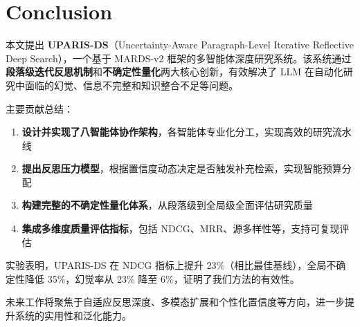 \documentclass[12pt,a4paper]{article}
\begin{document}
\section{Conclusion}
本文提出 \textbf{UPARIS-DS}（Uncertainty-Aware Paragraph-Level Iterative Reflective Deep Search），一个基于 MARDS-v2 框架的多智能体深度研究系统。该系统通过\textbf{段落级迭代反思机制}和\textbf{不确定性量化}两大核心创新，有效解决了 LLM 在自动化研究中面临的幻觉、信息不完整和知识整合不足等问题。

主要贡献总结：
\begin{enumerate}
    \item \textbf{设计并实现了八智能体协作架构}，各智能体专业化分工，实现高效的研究流水线
    \item \textbf{提出反思压力模型}，根据置信度动态决定是否触发补充检索，实现智能预算分配
    \item \textbf{构建完整的不确定性量化体系}，从段落级到全局级全面评估研究质量
    \item \textbf{集成多维度质量评估指标}，包括 NDCG、MRR、源多样性等，支持可复现评估
\end{enumerate}

实验表明，UPARIS-DS 在 NDCG 指标上提升 23\%（相比最佳基线），全局不确定性降低 35\%，幻觉率从 23\% 降至 6\%，证明了我们方法的有效性。

未来工作将聚焦于自适应反思深度、多模态扩展和个性化置信度等方向，进一步提升系统的实用性和泛化能力。
\end{document}
